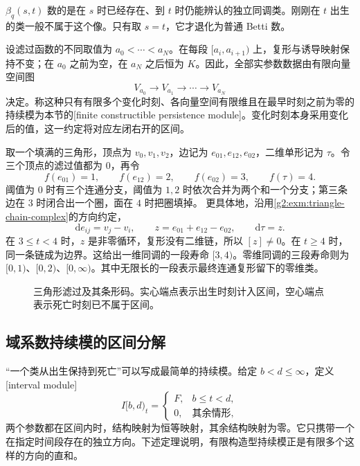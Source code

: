 \(\beta_q(s,t)\) 数的是在 \(s\) 时已经存在、到 \(t\) 时仍能辨认的独立同调类。刚刚在 \(t\) 出生的类一般不属于这个像。只有取 \(s=t\)，它才退化为普通 Betti 数。

\ProseParagraphBreak

设滤过函数的不同取值为 \(a_0<\cdots<a_N\)。在每段 \([a_i,a_{i+1})\) 上，复形与诱导映射保持不变；在 \(a_0\) 之前为空，在 \(a_N\) 之后恒为 \(K\)。因此，全部实参数数据由有限向量空间图
\[
	V_{a_0}\longrightarrow V_{a_1}\longrightarrow\cdots\longrightarrow V_{a_N}
\]
决定。称这种只有有限多个变化时刻、各向量空间有限维且在最早时刻之前为零的持续模为本节的[finite constructible persistence module]。变化时刻本身采用变化后的值，这一约定将对应左闭右开的区间。

\begin{example}\label{g2:exm:persistence-triangle}
	取一个填满的三角形，顶点为 \(v_0,v_1,v_2\)，边记为 \(e_{01},e_{12},e_{02}\)，二维单形记为 \(\tau\)。令三个顶点的滤过值都为 \(0\)，再令
	\[
		f(e_{01})=1,\qquad f(e_{12})=2,\qquad f(e_{02})=3,\qquad f(\tau)=4.
	\]
	阈值为 \(0\) 时有三个连通分支，阈值为 \(1,2\) 时依次合并为两个和一个分支；第三条边在 \(3\) 时闭合出一个圈，面在 \(4\) 时把圈填掉。
	\ProseParagraphBreak
	更具体地，沿用\cref{g2:exm:triangle-chain-complex}的方向约定，
	\[
		\mathrm d e_{ij}=v_j-v_i,\qquad z=e_{01}+e_{12}-e_{02},\qquad \mathrm d\tau=z.
	\]
	在 \(3\leq t<4\) 时，\(z\) 是非零循环，复形没有二维链，所以 \([z]\neq0\)。在 \(t\geq4\) 时，同一条链成为边界。这给出一维同调的一段寿命 \([3,4)\)。零维同调的三段寿命则为 \([0,1)\)、\([0,2)\)、\([0,\infty)\)。其中无限长的一段表示最终连通复形留下的零维类。
\end{example}

\begin{figure}[htbp]
	\centering
	
	\caption{三角形滤过及其条形码。实心端点表示出生时刻计入区间，空心端点表示死亡时刻已不属于区间。}
	\label{g2:fig:persistence-triangle}
\end{figure}

\subsection{域系数持续模的区间分解}
\label{g2:subsec:C03:02}

“一个类从出生保持到死亡”可以写成最简单的持续模。给定 \(b<d\leq\infty\)，定义[interval module]
\[
	I[b,d)_t=\begin{cases}F,&b\leq t<d,\\0,&\text{其余情形},\end{cases}
\]
两个参数都在区间内时，结构映射为恒等映射，其余结构映射为零。它只携带一个在指定时间段存在的独立方向。下述定理说明，有限构造型持续模正是有限多个这样的方向的直和。

